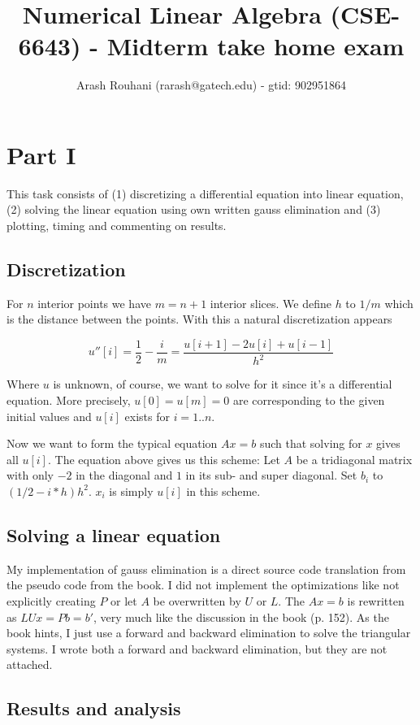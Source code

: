 \documentclass[a4paper,11pt]{article}
\title{Numerical Linear Algebra (CSE-6643) - Midterm take home exam}
\author{Arash Rouhani (rarash@gatech.edu) - gtid: 902951864}
\begin{document}
\maketitle

\section{Part I}

This task consists of (1) discretizing a differential equation into
linear equation, (2) solving the linear equation using own
written gauss elimination and (3) plotting,  timing and commenting on
results.

\subsection{Discretization}

For $n$ interior points we have $m=n+1$ interior slices. We define $h$
to $1/m$ which is the distance between the points. With this a natural
discretization appears

\[
  u''[i] = \frac{1}{2} - \frac{i}{m} = \frac{u[i+1]-2u[i]+u[i-1]}{h^2}
\]

Where $u$ is unknown, of course, we want to solve for it since it's a
differential equation. More precisely, $u[0]=u[m]=0$ are corresponding
to the given initial values and $u[i]$ exists for $i = 1..n$.

Now we want to form the typical equation $Ax=b$ such that solving for
$x$ gives all $u[i]$. The equation above gives us this scheme: Let $A$
be a tridiagonal matrix with only $-2$ in the diagonal and $1$ in its
sub- and super diagonal. Set $b_i$ to $(1/2-i*h)h^2$. $x_i$ is simply
$u[i]$ in this scheme.

\subsection{Solving a linear equation}

My implementation of gauss elimination is a direct source code
translation from the pseudo code from the book. I did not implement the
optimizations like not explicitly creating $P$ or let $A$ be overwritten
by $U$ or $L$. The $Ax=b$ is rewritten as $LUx=Pb=b'$, very much like
the discussion in the book (p. 152). As the book hints, I just use a
forward and backward elimination to solve the triangular systems. I
wrote both a forward and backward elimination, but they are not
attached.

\subsection{Results and analysis}
\end{document}
